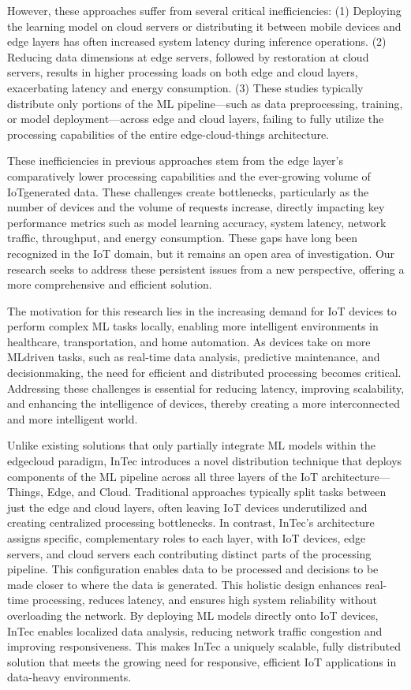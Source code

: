 \documentclass[11pt]{article}
\begin{document}
	However, these approaches suffer from several critical inefficiencies: (1)
	Deploying the learning model on cloud servers or distributing it between mobile
	devices and edge layers has often increased system latency during inference operations. (2) Reducing data dimensions at edge servers, followed by restoration at
	cloud servers, results in higher processing loads on both edge and cloud layers,
	exacerbating latency and energy consumption. (3) These studies typically distribute only portions of the ML pipeline—such as data preprocessing, training, or
	model deployment—across edge and cloud layers, failing to fully utilize the processing capabilities of the entire edge-cloud-things architecture.
	
	These inefficiencies in previous approaches stem from the edge layer’s comparatively lower processing capabilities and the ever-growing volume of IoTgenerated data. These challenges create bottlenecks, particularly as the number of devices and the volume of requests increase, directly impacting key performance metrics such as model learning accuracy, system latency, network traffic, throughput, and energy consumption. These gaps have long been recognized in
	the IoT domain, but it remains an open area of investigation. Our research seeks
	to address these persistent issues from a new perspective, offering a more comprehensive and efficient solution.
	
	The motivation for this research lies in the increasing demand for IoT devices
	to perform complex ML tasks locally, enabling more intelligent environments in
	healthcare, transportation, and home automation. As devices take on more MLdriven tasks, such as real-time data analysis, predictive maintenance, and decisionmaking, the need for efficient and distributed processing becomes critical. Addressing these challenges is essential for reducing latency, improving scalability, and
	enhancing the intelligence of devices, thereby creating a more interconnected and
	more intelligent world.
	
	Unlike existing solutions that only partially integrate ML models within the edgecloud paradigm, InTec introduces a novel distribution technique that deploys components of the ML pipeline across all three layers of the IoT architecture—Things,
	Edge, and Cloud. Traditional approaches typically split tasks between just the edge
	and cloud layers, often leaving IoT devices underutilized and creating centralized
	processing bottlenecks. In contrast, InTec’s architecture assigns specific, complementary roles to each layer, with IoT devices, edge servers, and cloud servers each
	contributing distinct parts of the processing pipeline. This configuration enables
	data to be processed and decisions to be made closer to where the data is generated.
	This holistic design enhances real-time processing, reduces latency, and ensures
	high system reliability without overloading the network. By deploying ML models
	directly onto IoT devices, InTec enables localized data analysis, reducing network
	traffic congestion and improving responsiveness. This makes InTec a uniquely scalable, fully distributed solution that meets the growing need for responsive, efficient
	IoT applications in data-heavy environments.
	
\end{document}
